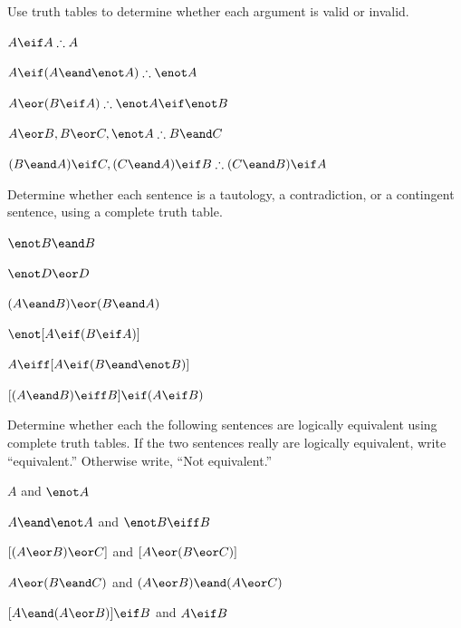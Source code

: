 \solutions
\problempart
\label{pr.TT.valid}
Use truth tables to determine whether each argument is valid or invalid.
\begin{compactlist}
\item $A\eif A \therefore A$ %
\item $A\eif(A\eand\enot A) \therefore \enot A$ %
\item $A\eor(B\eif A) \therefore \enot A \eif \enot B$ %
\item $A\eor B, B\eor C, \enot A \therefore B \eand C$ %
\item $(B\eand A)\eif C, (C\eand A)\eif B \therefore (C\eand B)\eif A$ %
\end{compactlist}

\problempart Determine whether each sentence is a tautology, a contradiction, or a contingent sentence, using a complete truth table.
\begin{compactlist}
\item $\enot B \eand B$ \vspace{.5ex}%


\item $\enot D \eor D$ \vspace{.5ex}%


\item $(A\eand B) \eor (B\eand A)$\vspace{.5ex} %


\item $\enot[A \eif (B \eif A)]$\vspace{.5ex} %


\item $A \eiff [A \eif (B \eand \enot B)]$ \vspace{.5ex}%


\item $[(A \eand B) \eiff B] \eif (A \eif B)$ \vspace{.5ex}%

\end{compactlist}



\noindent\problempart
\label{pr.TT.equiv}
Determine whether each the following sentences are logically equivalent using complete truth tables. If the two sentences really are logically equivalent, write ``equivalent.'' Otherwise write, ``Not equivalent.'' 
\begin{compactlist}
\item $A$ and $\enot A$
\item $A \eand \enot A$ and $\enot B \eiff B$
\item $[(A \eor B) \eor C]$ and $[A \eor (B \eor C)]$
\item $A \eor (B \eand C)$ and $(A \eor B) \eand (A \eor C)$
\item $[A \eand (A \eor B)] \eif B$ and $A \eif B$\end{compactlist}


